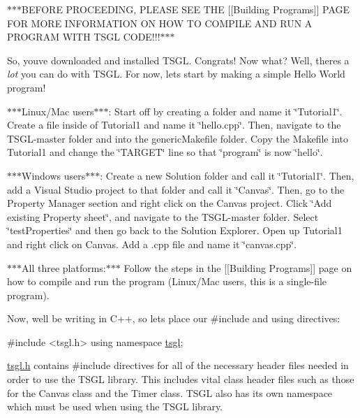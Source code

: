 $\ast$$\ast$$\ast$\+B\+E\+F\+O\+R\+E P\+R\+O\+C\+E\+E\+D\+I\+N\+G, P\+L\+E\+A\+S\+E S\+E\+E T\+H\+E \mbox{[}\mbox{[}Building Programs\mbox{]}\mbox{]} P\+A\+G\+E F\+O\+R M\+O\+R\+E I\+N\+F\+O\+R\+M\+A\+T\+I\+O\+N O\+N H\+O\+W T\+O C\+O\+M\+P\+I\+L\+E A\+N\+D R\+U\+N A P\+R\+O\+G\+R\+A\+M W\+I\+T\+H T\+S\+G\+L C\+O\+D\+E!!!$\ast$$\ast$$\ast$

So, you\textquotesingle{}ve downloaded and installed T\+S\+G\+L. Congrats! Now what? Well, there\textquotesingle{}s a {\itshape lot} you can do with T\+S\+G\+L. For now, let\textquotesingle{}s start by making a simple Hello World program!

$\ast$$\ast$$\ast$\+Linux/\+Mac users$\ast$$\ast$$\ast$\+: Start off by creating a folder and name it \char`\"{}\+Tutorial1\char`\"{}. Create a file inside of Tutorial1 and name it \char`\"{}hello.\+cpp\char`\"{}. Then, navigate to the T\+S\+G\+L-\/master folder and into the generic\+Makefile folder. Copy the Makefile into Tutorial1 and change the \char`\"{}\+T\+A\+R\+G\+E\+T\char`\"{} line so that \char`\"{}program\char`\"{} is now \char`\"{}hello\char`\"{}.

$\ast$$\ast$$\ast$\+Windows users$\ast$$\ast$$\ast$\+: Create a new Solution folder and call it \char`\"{}\+Tutorial1\char`\"{}. Then, add a Visual Studio project to that folder and call it \char`\"{}\+Canvas\char`\"{}. Then, go to the Property Manager section and right click on the Canvas project. Click \char`\"{}\+Add existing Property sheet\char`\"{}, and navigate to the T\+S\+G\+L-\/master folder. Select \char`\"{}test\+Properties\char`\"{} and then go back to the Solution Explorer. Open up Tutorial1 and right click on Canvas. Add a .cpp file and name it \char`\"{}canvas.\+cpp\char`\"{}.

$\ast$$\ast$$\ast$\+All three platforms\+:$\ast$$\ast$$\ast$ Follow the steps in the \mbox{[}\mbox{[}Building Programs\mbox{]}\mbox{]} page on how to compile and run the program (Linux/\+Mac users, this is a single-\/file program).

Now, we\textquotesingle{}ll be writing in C++, so let\textquotesingle{}s place our \#include and using directives\+:


\begin{DoxyCode}
\textcolor{preprocessor}{#include <tsgl.h>}
\textcolor{keyword}{using namespace }\hyperlink{namespacetsgl}{tsgl};
\end{DoxyCode}


\hyperlink{tsgl_8h_source}{tsgl.\+h} contains \#include directives for all of the necessary header files needed in order to use the T\+S\+G\+L library. This includes vital class header files such as those for the Canvas class and the Timer class. T\+S\+G\+L also has its own namespace which must be used when using the T\+S\+G\+L library.


